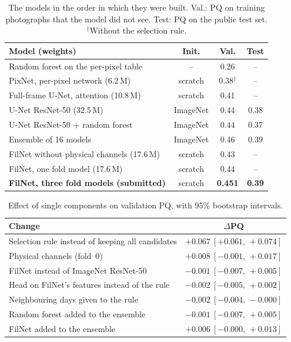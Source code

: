 \documentclass[sigconf]{acmart}
\newcommand{\nfolds}{three}          %
\newcommand{\oofpq}{0.451}           %
\newcommand{\rulegain}{$+0.067\ [+0.061,\,+0.074]$}   %
\newcommand{\vsrfifty}{$-0.001\ [-0.007,\,+0.005]$}   %
\begin{document}
\begin{table}[t]
\caption{The models in the order in which they were built. Val.: PQ on training photographs that the model did not see. Test: PQ on the public test set. $^\dagger$Without the selection rule.}
\label{tab:dev}
\centering\small
\begin{tabular}{@{}lccc@{}}
\toprule
Model (weights) & Init. & Val. & Test \\
\midrule
Random forest on the per-pixel table & -- & 0.26 & -- \\
PixNet, per-pixel network (6.2\,M) & scratch & 0.38$^\dagger$ & -- \\
Full-frame U-Net, attention (10.8\,M) & scratch & 0.41 & -- \\
U-Net ResNet-50 (32.5\,M) & ImageNet & 0.44 & 0.38 \\
U-Net ResNet-50 + random forest & ImageNet & 0.44 & 0.37 \\
Ensemble of 16 models & ImageNet & 0.46 & 0.39 \\
\midrule
FilNet without physical channels (17.6\,M) & scratch & 0.43 & -- \\
FilNet, one fold model (17.6\,M) & scratch & 0.44 & -- \\
\textbf{FilNet, \nfolds{} fold models (submitted)} & scratch & \textbf{\oofpq} & \textbf{0.39} \\
\bottomrule
\end{tabular}
\end{table}

\begin{table}[t]
\caption{Effect of single components on validation PQ, with 95\% bootstrap intervals.}
\label{tab:abl}
\centering\small
\begin{tabular}{@{}lc@{}}
\toprule
Change & $\Delta$PQ \\
\midrule
Selection rule instead of keeping all candidates & \rulegain \\
Physical channels (fold~0) & $+0.008\ [-0.001,\,+0.017]$ \\
FilNet instead of ImageNet ResNet-50 & \vsrfifty \\
Head on FilNet's features instead of the rule & $-0.002\ [-0.005,\,+0.002]$ \\
\midrule
Neighbouring days given to the rule & $-0.002\ [-0.004,\,-0.000]$ \\
Random forest added to the ensemble & $-0.001\ [-0.007,\,+0.005]$ \\
FilNet added to the ensemble & $+0.006\ [-0.000,\,+0.013]$ \\
\bottomrule
\end{tabular}
\end{table}
\end{document}
